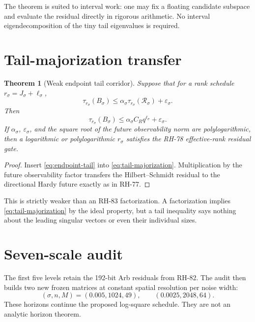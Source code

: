 \documentclass[11pt]{article}
\newtheorem{theorem}{Theorem}[section]
\theoremstyle{remark}
\newcommand{\cR}{\mathcal R}
\begin{document}
The theorem is suited to interval work: one may fix a floating candidate
subspace and evaluate the residual directly in rigorous arithmetic.  No
interval eigendecomposition of the tiny tail eigenvalues is required.

\section{Tail-majorization transfer}

\begin{theorem}[Weak endpoint tail corridor]
\label{thm:transfer}
Suppose that for a rank schedule $r_\sigma=J_\sigma+\ell_\sigma$,
\begin{equation}
 \tau_{r_\sigma}(B_\sigma)
 \le\alpha_\sigma\tau_{r_\sigma}(\cR_\sigma)
 +\varepsilon_\sigma.
 \label{eq:tail-majorization}
\end{equation}
Then
\begin{equation}
 \boxed{
 \tau_{r_\sigma}(B_\sigma)
 \le\alpha_\sigma C_Rq^{\ell_\sigma}
 +\varepsilon_\sigma.}
 \label{eq:transferred-tail}
\end{equation}
If $\alpha_\sigma$, $\varepsilon_\sigma$, and the square root of the future
observability norm are polylogarithmic, then a logarithmic or
polylogarithmic $r_\sigma$ satisfies the RH-78 effective-rank residual gate.
\end{theorem}

\begin{proof}
Insert \eqref{eq:endpoint-tail} into
\eqref{eq:tail-majorization}.  Multiplication by the future observability
factor transfers the Hilbert--Schmidt residual to the directional Hardy
future exactly as in RH-77.
\end{proof}

This is strictly weaker than an RH-83 factorization.  A factorization implies
\eqref{eq:tail-majorization} by the ideal property, but a tail inequality says
nothing about the leading singular vectors or even their individual sizes.

\section{Seven-scale audit}

The first five levels retain the 192-bit Arb residuals from RH-82.  The audit
then builds two new frozen matrices at constant spatial resolution per noise
width:
\[
 (\sigma,n,M)=(0.005,1024,49),
 \qquad(0.0025,2048,64).
\]
These horizons continue the proposed log-square schedule.  They are not an
analytic horizon theorem.
\end{document}
